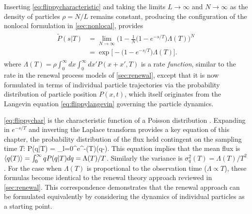 Inserting \DIFdelbegin {}\DIFdelend \DIFaddbegin {}\DIFaddend \ref{eq:flippycharacteristic} and taking the limits $L\rightarrow \infty$ and $N \rightarrow \infty$ as the density of particles $\rho = N/L$ remains constant, producing the configuration of the nonlocal formulation in \DIFdelbegin {}\DIFdelend \DIFaddbegin {}\DIFaddend \ref{sec:nonlocal}, provides
\DIFdelbegin %
\DIFdelend \DIFaddbegin \begin{align}
\begin{split} \tilde{P}(s|T) &= \lim_{N \rightarrow \infty} \Big(1 - \frac{1}{N}\big(1-e^{-s/T}\big)\Lambda(T) \Big)^N \\ &= \exp \Big[ -\big(1-e^{-s/T}\big)\Lambda(T) \Big]. 
\end{split}
\label{eq:flippychar} 
\end{align}\DIFaddend 
where $\Lambda(T) = \rho \int_0^\infty dx \int_0^\infty dx' P(x+x',T)$ is a rate \textit{function}, similar to the rate \DIFdelbegin {}\DIFdelend \DIFaddbegin \textit{} \DIFaddend in the renewal process models of \DIFdelbegin {}\DIFdelend \DIFaddbegin {}\DIFaddend \ref{sec:renewal}, except that it is now formulated in terms of individual particle trajectories via the probability distribution of particle position $P(x,t)$, which itself originates from the Langevin equation \ref{eq:flippylangevin} governing the particle dynamics.

\DIFdelbegin {}\DIFdelend \DIFaddbegin {}\DIFaddend \ref{eq:flippychar} is the characteristic function of a Poisson distribution \citep{Cox1965}.
Expanding in $e^{-s/T}$ and inverting the Laplace transform provides a key equation of this chapter, the probability distribution of the flux held contingent on the sampling time $T$:
\be P(q|T) = \sum_{l=0}^\infty {}e^{-\Lambda(T)}\delta(q-). \label{eq:flippydist}\ee
This equation implies that the mean flux is $\langle q(T) \rangle = \int_0^\infty q P(q|T) dq = \Lambda(T)/T$. Similarly the variance is $\sigma_q^2(T) = \Lambda(T)/T^2$. For the case when $\Lambda(T)$ is proportional to the observation time ($\Lambda \propto T$), these formulas become identical to the renewal theory approach reviewed in \DIFdelbegin {}\DIFdelend \DIFaddbegin {}\DIFaddend \ref{sec:renewal}.
This correspondence demonstrates that the renewal approach can be formulated equivalently by considering the dynamics of individual particles as a starting point.

